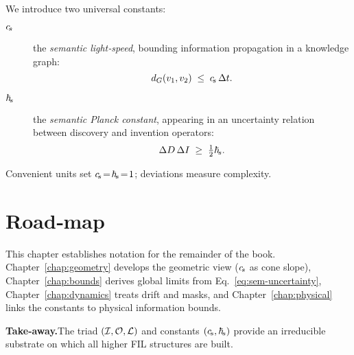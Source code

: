 We introduce two universal constants:
\begin{description}
  \item[$c_{\!s}$] the \emph{semantic light‑speed}, bounding information propagation in a
  knowledge graph:
  \begin{equation}
    d_G(v_1,v_2)\;\le\;c_{\!s}\,\Delta t.
  \end{equation}

  \item[$\hbar_{\!s}$] the \emph{semantic Planck constant}, appearing in an uncertainty relation
  between discovery and invention operators:
  \begin{equation}
    \Delta D\,\Delta I\;\ge\;\tfrac12\hbar_{\!s}.\label{eq:sem-uncertainty}
  \end{equation}
\end{description}
Convenient units set $c_{\!s}\!=\!\hbar_{\!s}\!=\!1$; deviations measure complexity.

\section{Road‑map}
This chapter establishes notation for the remainder of the book.
Chapter~\ref{chap:geometry} develops the geometric view ($c_{\!s}$ as cone slope),
Chapter~\ref{chap:bounds} derives global limits from Eq.~\eqref{eq:sem-uncertainty},
Chapter~\ref{chap:dynamics} treats drift and masks, and
Chapter~\ref{chap:physical} links the constants to physical information bounds.

\bigskip\noindent\textbf{Take‑away.}\;The triad $(\mathcal I,\mathcal O,\mathcal L)$ and constants $(c_{\!s},\hbar_{\!s})$ provide
an irreducible substrate on which all higher FIL structures are built.

\clearpage
